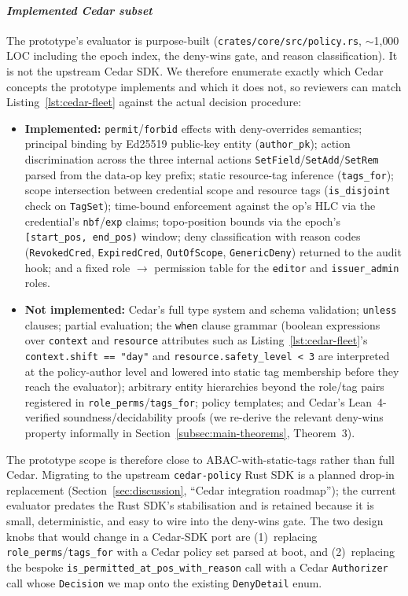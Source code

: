 \documentclass[10pt,journal,compsoc]{IEEEtran}
\begin{document}
\paragraph*{\textit{\textbf{Implemented Cedar subset}}}
The prototype's evaluator is purpose-built (\texttt{crates/core/src/policy.rs}, $\sim$1{,}000 LOC including the epoch index, the deny-wins gate, and reason classification). It is not the upstream Cedar SDK. We therefore enumerate exactly which Cedar concepts the prototype implements and which it does not, so reviewers can match Listing~\ref{lst:cedar-fleet} against the actual decision procedure:

\begin{itemize}
  \item \textbf{Implemented:} \texttt{permit}/\texttt{forbid} effects with deny-overrides semantics; principal binding by Ed25519 public-key entity (\texttt{author\_pk}); action discrimination across the three internal actions \texttt{SetField}/\texttt{SetAdd}/\texttt{SetRem} parsed from the data-op key prefix; static resource-tag inference (\texttt{tags\_for}); scope intersection between credential scope and resource tags (\texttt{is\_disjoint} check on \texttt{TagSet}); time-bound enforcement against the op's HLC via the credential's \texttt{nbf}/\texttt{exp} claims; topo-position bounds via the epoch's \texttt{[start\_pos, end\_pos)} window; deny classification with reason codes (\texttt{RevokedCred}, \texttt{ExpiredCred}, \texttt{OutOfScope}, \texttt{GenericDeny}) returned to the audit hook; and a fixed role $\rightarrow$ permission table for the \texttt{editor} and \texttt{issuer\_admin} roles.
  \item \textbf{Not implemented:} Cedar's full type system and schema validation; \texttt{unless} clauses; partial evaluation; the \texttt{when} clause grammar (boolean expressions over \texttt{context} and \texttt{resource} attributes such as Listing~\ref{lst:cedar-fleet}'s \texttt{context.shift == "day"} and \texttt{resource.safety\_level < 3} are interpreted at the policy-author level and lowered into static tag membership before they reach the evaluator); arbitrary entity hierarchies beyond the role/tag pairs registered in \texttt{role\_perms}/\texttt{tags\_for}; policy templates; and Cedar's Lean~4-verified soundness/decidability proofs (we re-derive the relevant deny-wins property informally in Section~\ref{subsec:main-theorems}, Theorem~3).
\end{itemize}

The prototype scope is therefore close to ABAC-with-static-tags rather than full Cedar. Migrating to the upstream \texttt{cedar-policy} Rust SDK is a planned drop-in replacement (Section~\ref{sec:discussion}, ``Cedar integration roadmap''); the current evaluator predates the Rust SDK's stabilisation and is retained because it is small, deterministic, and easy to wire into the deny-wins gate. The two design knobs that would change in a Cedar-SDK port are (1)~replacing \texttt{role\_perms}/\texttt{tags\_for} with a Cedar policy set parsed at boot, and (2)~replacing the bespoke \texttt{is\_permitted\_at\_pos\_with\_reason} call with a Cedar \texttt{Authorizer} call whose \texttt{Decision} we map onto the existing \texttt{DenyDetail} enum.
\end{document}
